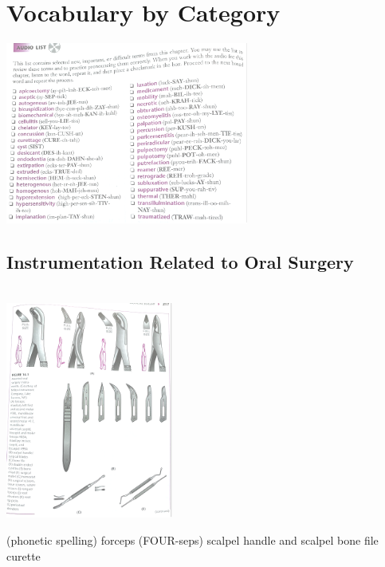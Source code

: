 \documentclass[
paper=landscape,
paper=160mm:90mm, %
fontsize=11pt, %
pagesize, %
parskip=half-, %
]{scrartcl} %
\newenvironment{WrapText1}[3][r]
{\wrapfigure[#2]{#1}{#3}}
{\endwrapfigure}
\newcommand{\wrapr}[6]{
\begin{minipage}{\linewidth}\mbox{}\\
\vspace{#1}
\begin{WrapText1}{#2}{#3}
\vspace{#4}#5\end{WrapText1}#6
\end{minipage}}
\theoremstyle{mythmstyle} %
\begin{document}
\clearpage
\section{Vocabulary by Category} %

\begin{center} %
    \centering
    \captionsetup{labelformat=empty}
    \includegraphics[width=8cm]{p214.pdf}
\end{center}


\subsection{Instrumentation Related to Oral Surgery}

\wrapr{-1mm}{7}{9cm}{-15mm}
{%
\includegraphics[width=5.5cm]{p217.pdf}
} %
{%
\begin{outline}
\0 (phonetic spelling)
\1 forceps (FOUR-seps)
\1 scalpel handle and scalpel
\1 bone file
\1 curette
\end{outline}
} %
\clearpage
\end{document}
